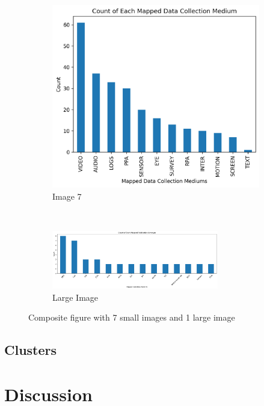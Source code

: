\documentclass[manuscript,screen,review]{acmart}
\begin{document}
\begin{figure}[h!]
    \hfill
    \begin{subfigure}[b]{0.33\textwidth}
        \includegraphics[width=\textwidth]{img/statistical_imgs/data_collection_mediums.png}
        \caption{Image 7}
    \end{subfigure}
    \\
    \begin{subfigure}[b]{\textwidth}
        \includegraphics[width=0.8\textwidth]{img/statistical_imgs/publications_w_o_others.png}
        \caption{Large Image}
    \end{subfigure}
    \caption{Composite figure with 7 small images and 1 large image}
\end{figure}

\subsection{Clusters} %


\section{Discussion} \label{sec:discussion}
\end{document}

